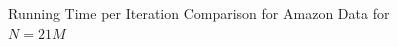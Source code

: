 \documentclass[12pt,notitlepage,oneside]{report}
\begin{document}
 
\begin{figure}[!htbp]
    \centering
    \caption{Running Time per Iteration Comparison for Amazon Data for $N=21M$}
    \label{comp:D}
\end{figure}
\end{document}
